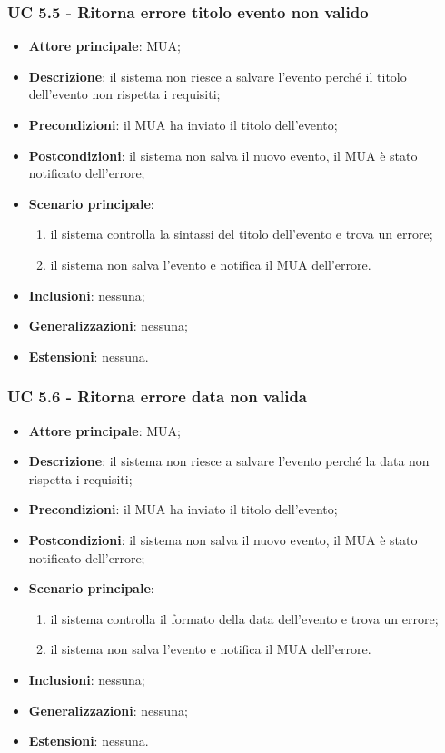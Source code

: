     \subsubsection{UC 5.5 - Ritorna errore titolo evento non valido} \label{sec:UC5.5}
    \begin{itemize}
        \item \textbf{Attore principale}: MUA;
        \item \textbf{Descrizione}: il sistema non riesce a salvare l'evento perché il titolo dell'evento non rispetta i requisiti;
        \item \textbf{Precondizioni}: il MUA ha inviato il titolo dell'evento;
        \item \textbf{Postcondizioni}: il sistema non salva il nuovo evento, il MUA è stato notificato dell'errore;
        \item \textbf{Scenario principale}:
            \begin{enumerate}
                \item il sistema controlla la sintassi del titolo dell'evento e trova un errore;
                \item il sistema non salva l'evento e notifica il MUA dell'errore.
            \end{enumerate}
        \item \textbf{Inclusioni}: nessuna;
        \item \textbf{Generalizzazioni}: nessuna;
        \item \textbf{Estensioni}: nessuna.
    \end{itemize}


    \subsubsection{UC 5.6 - Ritorna errore data non valida} \label{sec:UC5.6}
    \begin{itemize}
        \item \textbf{Attore principale}: MUA;
        \item \textbf{Descrizione}: il sistema non riesce a salvare l'evento perché la data non rispetta i requisiti;
        \item \textbf{Precondizioni}: il MUA ha inviato il titolo dell'evento;
        \item \textbf{Postcondizioni}: il sistema non salva il nuovo evento, il MUA è stato notificato dell'errore;
        \item \textbf{Scenario principale}:
            \begin{enumerate}
                \item il sistema controlla il formato della data dell'evento e trova un errore;
                \item il sistema non salva l'evento e notifica il MUA dell'errore.
            \end{enumerate}
        \item \textbf{Inclusioni}: nessuna;
        \item \textbf{Generalizzazioni}: nessuna;
        \item \textbf{Estensioni}: nessuna.
    \end{itemize}

